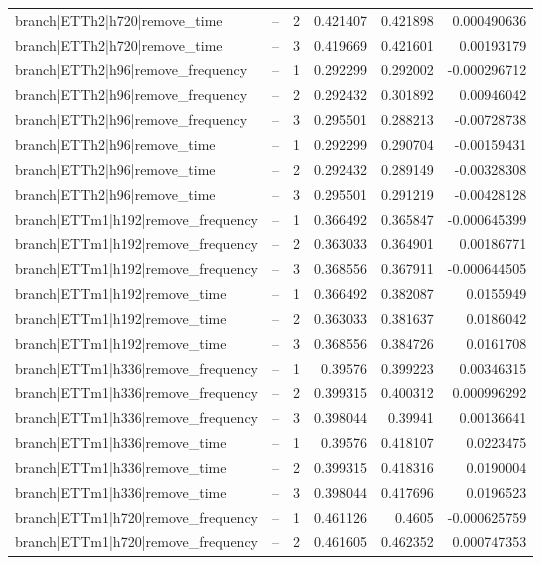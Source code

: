 \begin{longtable}{llrrrr}
branch|ETTh2|h720|remove\_time & -- & 2 & 0.421407 & 0.421898 & 0.000490636 \\
branch|ETTh2|h720|remove\_time & -- & 3 & 0.419669 & 0.421601 & 0.00193179 \\
branch|ETTh2|h96|remove\_frequency & -- & 1 & 0.292299 & 0.292002 & -0.000296712 \\
branch|ETTh2|h96|remove\_frequency & -- & 2 & 0.292432 & 0.301892 & 0.00946042 \\
branch|ETTh2|h96|remove\_frequency & -- & 3 & 0.295501 & 0.288213 & -0.00728738 \\
branch|ETTh2|h96|remove\_time & -- & 1 & 0.292299 & 0.290704 & -0.00159431 \\
branch|ETTh2|h96|remove\_time & -- & 2 & 0.292432 & 0.289149 & -0.00328308 \\
branch|ETTh2|h96|remove\_time & -- & 3 & 0.295501 & 0.291219 & -0.00428128 \\
branch|ETTm1|h192|remove\_frequency & -- & 1 & 0.366492 & 0.365847 & -0.000645399 \\
branch|ETTm1|h192|remove\_frequency & -- & 2 & 0.363033 & 0.364901 & 0.00186771 \\
branch|ETTm1|h192|remove\_frequency & -- & 3 & 0.368556 & 0.367911 & -0.000644505 \\
branch|ETTm1|h192|remove\_time & -- & 1 & 0.366492 & 0.382087 & 0.0155949 \\
branch|ETTm1|h192|remove\_time & -- & 2 & 0.363033 & 0.381637 & 0.0186042 \\
branch|ETTm1|h192|remove\_time & -- & 3 & 0.368556 & 0.384726 & 0.0161708 \\
branch|ETTm1|h336|remove\_frequency & -- & 1 & 0.39576 & 0.399223 & 0.00346315 \\
branch|ETTm1|h336|remove\_frequency & -- & 2 & 0.399315 & 0.400312 & 0.000996292 \\
branch|ETTm1|h336|remove\_frequency & -- & 3 & 0.398044 & 0.39941 & 0.00136641 \\
branch|ETTm1|h336|remove\_time & -- & 1 & 0.39576 & 0.418107 & 0.0223475 \\
branch|ETTm1|h336|remove\_time & -- & 2 & 0.399315 & 0.418316 & 0.0190004 \\
branch|ETTm1|h336|remove\_time & -- & 3 & 0.398044 & 0.417696 & 0.0196523 \\
branch|ETTm1|h720|remove\_frequency & -- & 1 & 0.461126 & 0.4605 & -0.000625759 \\
branch|ETTm1|h720|remove\_frequency & -- & 2 & 0.461605 & 0.462352 & 0.000747353 \\

\end{longtable}
